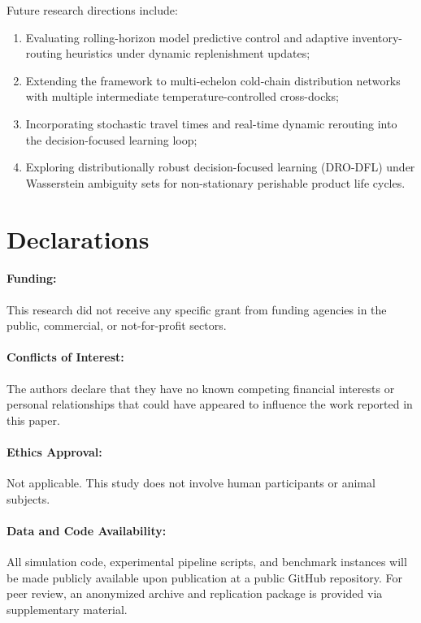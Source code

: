 \documentclass[11pt,a4paper]{article}
\theoremstyle{definition}
\theoremstyle{remark}
\begin{document}
Future research directions include:
\begin{enumerate}[label=(\roman*)]
    \item Evaluating rolling-horizon model predictive control and adaptive inventory-routing heuristics under dynamic replenishment updates;
    \item Extending the framework to multi-echelon cold-chain distribution networks with multiple intermediate temperature-controlled cross-docks;
    \item Incorporating stochastic travel times and real-time dynamic rerouting into the decision-focused learning loop;
    \item Exploring distributionally robust decision-focused learning (DRO-DFL) under Wasserstein ambiguity sets for non-stationary perishable product life cycles.
\end{enumerate}

\section*{Declarations}

\paragraph{Funding:} This research did not receive any specific grant from funding agencies in the public, commercial, or not-for-profit sectors.

\paragraph{Conflicts of Interest:} The authors declare that they have no known competing financial interests or personal relationships that could have appeared to influence the work reported in this paper.

\paragraph{Ethics Approval:} Not applicable. This study does not involve human participants or animal subjects.

\paragraph{Data and Code Availability:} All simulation code, experimental pipeline scripts, and benchmark instances will be made publicly available upon publication at a public GitHub repository. For peer review, an anonymized archive and replication package is provided via supplementary material.
\end{document}
